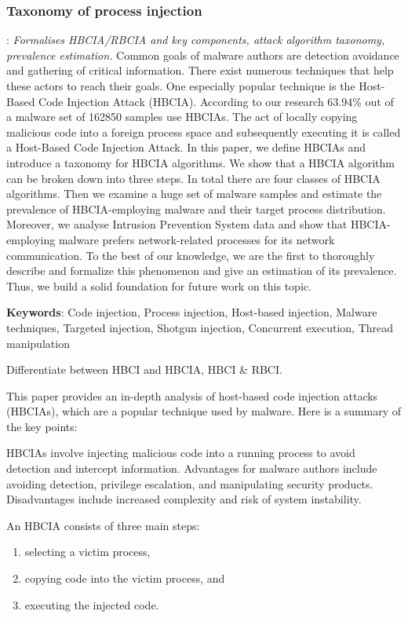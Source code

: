 \documentclass{article}
\begin{document}
\subsubsection{\textcite{Barabosch:2014} Taxonomy of process injection}
\textbf{}: \textit{Formalises HBCIA/RBCIA and key components, attack algorithm taxonomy, prevalence estimation.}  Common goals of malware authors are detection avoidance and gathering of critical information. There exist numerous techniques that help these actors to reach their goals. One especially popular technique is the Host-Based Code Injection Attack (HBCIA). According to our research 63.94\% out of a malware set of 162850 samples use HBCIAs. The act of locally copying malicious code into a foreign process space and subsequently executing it is called a Host-Based Code Injection Attack. In this paper, we define HBCIAs and introduce a taxonomy for HBCIA algorithms. We show that a HBCIA algorithm can be broken down into three steps. In total there are four classes of HBCIA algorithms. Then we examine a huge set of malware samples and estimate the prevalence of HBCIA-employing malware and their target process distribution. Moreover, we analyse Intrusion Prevention System data and show that HBCIA-employing malware prefers network-related processes for its network communication. To the best of our knowledge, we are the first to thoroughly describe and formalize this phenomenon and give an estimation of its prevalence. Thus, we build a solid foundation for future work on this topic.

\textbf{Keywords}: Code injection,  Process injection, Host-based injection, Malware techniques, Targeted injection, Shotgun injection, Concurrent execution, Thread manipulation

Differentiate between HBCI and HBCIA, HBCI \& RBCI.

This paper provides an in-depth analysis of host-based code injection attacks (HBCIAs), which are a popular technique used by malware. Here is a summary of the key points:


HBCIAs involve injecting malicious code into a running process to avoid detection and intercept information. Advantages for malware authors include avoiding detection, privilege escalation, and manipulating security products. Disadvantages include increased complexity and risk of system instability.

An HBCIA consists of three main steps:

\begin{enumerate}
\item selecting a victim process,
\item copying code into the victim process, and
\item executing the injected code.
\end{enumerate}
\end{document}
